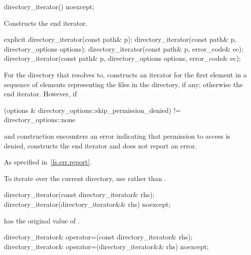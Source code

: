 %
\begin{itemdecl}
directory_iterator() noexcept;
\end{itemdecl}

\begin{itemdescr}
\pnum
\effects
Constructs the end iterator.
\end{itemdescr}

%
\begin{itemdecl}
explicit directory_iterator(const path& p);
directory_iterator(const path& p, directory_options options);
directory_iterator(const path& p, error_code& ec);
directory_iterator(const path& p, directory_options options, error_code& ec);
\end{itemdecl}

\begin{itemdescr}
\pnum
\effects
For the directory that  resolves to, constructs an
iterator for the first element in a sequence of 
elements representing the files in the directory, if any; otherwise the end
iterator. However, if
\begin{codeblock}
(options & directory_options::skip_permission_denied) != directory_options::none
\end{codeblock}
and construction encounters an error indicating
that permission to access  is denied, constructs the end iterator
and does not report an error.

\pnum
\throws
As specified in~\ref{fs.err.report}.

\pnum
\begin{note}
To iterate over the current directory, use  rather than .
\end{note}
\end{itemdescr}

%
\begin{itemdecl}
directory_iterator(const directory_iterator& rhs);
directory_iterator(directory_iterator&& rhs) noexcept;
\end{itemdecl}

\begin{itemdescr}
\pnum
\ensures
{} has the original value of .
\end{itemdescr}

%
\begin{itemdecl}
directory_iterator& operator=(const directory_iterator& rhs);
directory_iterator& operator=(directory_iterator&& rhs) noexcept;
\end{itemdecl}

